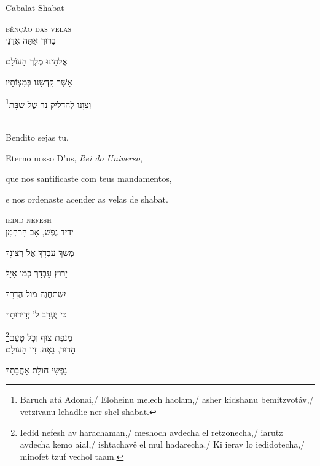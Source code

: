 \chapter*{}
\begin{center}
\begin{vplace}[0.3]
\Large
Cabalat Shabat
\end{vplace}
\end{center}
\thispagestyle{empty}


\movetoevenpage
\raggedleft

\textsc{bênção das velas}\\[15pt]

בָּרוּך אַתָּה אַדָנָי

אֱלהֵינוּ מֶלֶך הָעוֹלָם

אַשֶׁר קִדְשָנוּ בְּמִצְוֹתָיו

וְצִוָנוּ לְהַדְלִיק נֵר שֶל שַבָּת‏\footnote{Baruch atá Adonai,/ Eloheinu melech haolam,/ asher kidshanu bemitzvotáv,/ vetzivanu lehadlic ner shel shabat.}

\movetooddpage
\raggedright

\textsc{}\\[15pt]

Bendito sejas tu,

Eterno nosso D'us, \emph{Rei do Universo},

que nos santificaste com teus mandamentos,

e nos ordenaste acender as velas de shabat.

\movetoevenpage
\raggedleft

\textsc{iedid nefesh}\\[15pt]

יְדִיד נֶפֶשׁ, אָב הָרַחְמָן

מְשךְ עַבְדָךְ אֶל רְצונָךְ

יָרוּץ עַבְדָךְ כְמו אַיָל

יִשְתַחֲוֶה מוּל הֲדָרָךְ

כִּי יֶעְרַב לוֹ יְדִידוּתָךְ

מִנּפֶת צוּף וְכָל טָעַם\footnote{Iedid nefesh av harachaman,/ meshoch avdecha el retzonecha,/ iarutz avdecha kemo aial,/ ishtachavê el mul hadarecha./ Ki ierav lo iedidotecha,/ minofet tzuf vechol taam.}\\[10pt]

הָדוּר, נָאֶה, זִיו הָעולָם

נַפְשִי חולַת אַהֲבָתָךְ

